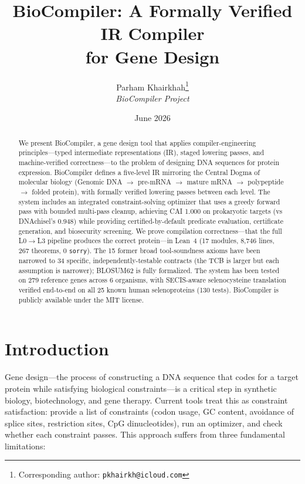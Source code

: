 \documentclass[11pt,a4paper]{article}
\title{BioCompiler: A Formally Verified IR Compiler\\for Gene Design}
\author{
  Parham Khairkhah\thanks{Corresponding author: \texttt{pkhairkh@icloud.com}}\\
  \textit{BioCompiler Project}
}
\date{June 2026}
\theoremstyle{definition}
\begin{document}
\maketitle

\begin{abstract}
We present BioCompiler, a gene design tool that applies compiler-engineering principles---typed intermediate representations (IR), staged lowering passes, and machine-verified correctness---to the problem of designing DNA sequences for protein expression. BioCompiler defines a five-level IR mirroring the Central Dogma of molecular biology (Genomic DNA $\to$ pre-mRNA $\to$ mature mRNA $\to$ polypeptide $\to$ folded protein), with formally verified lowering passes between each level. The system includes an integrated constraint-solving optimizer that uses a greedy forward pass with bounded multi-pass cleanup, achieving CAI 1.000 on prokaryotic targets (vs DNAchisel's 0.948) while providing certified-by-default predicate evaluation, certificate generation, and biosecurity screening. We prove compilation correctness---that the full L0$\to$L3 pipeline produces the correct protein---in Lean~4 (17 modules, 8{,}746 lines, 267 theorems, 0 \texttt{sorry}). The 15 former broad tool-soundness axioms have been narrowed to 34 specific, independently-testable contracts (the TCB is larger but each assumption is narrower); BLOSUM62 is fully formalized. The system has been tested on 279 reference genes across 6 organisms, with SECIS-aware selenocysteine translation verified end-to-end on all 25 known human selenoproteins (130 tests). BioCompiler is publicly available under the MIT license.
\end{abstract}

\section{Introduction}\label{sec:intro}

Gene design---the process of constructing a DNA sequence that codes for a target protein while satisfying biological constraints---is a critical step in synthetic biology, biotechnology, and gene therapy. Current tools treat this as constraint satisfaction: provide a list of constraints (codon usage, GC content, avoidance of splice sites, restriction sites, CpG dinucleotides), run an optimizer, and check whether each constraint passes. This approach suffers from three fundamental limitations:
\end{document}
